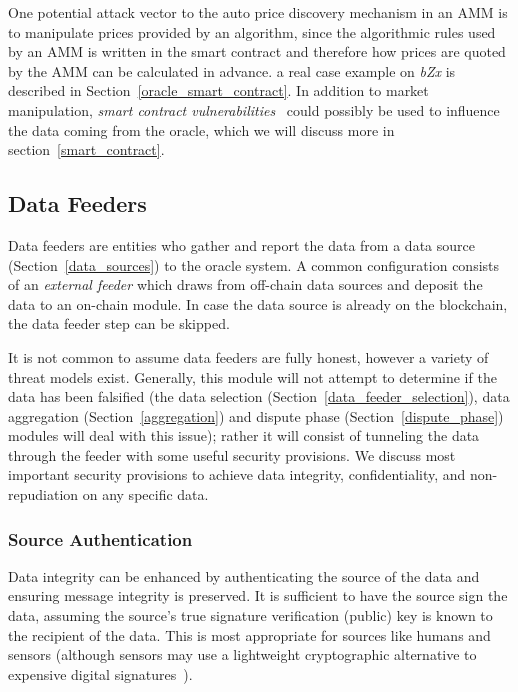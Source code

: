 
One potential attack vector to the auto price discovery mechanism in an AMM is to manipulate prices provided by an algorithm, since the algorithmic rules used by an AMM is written in the smart contract and therefore how prices are quoted by the AMM can be calculated in advance. a real case example on \textit{bZx} is described in Section~\ref{oracle_smart_contract}. In addition to market manipulation, \textit{smart contract vulnerabilities}~\cite{atzei2017survey,chen2020survey} could possibly be used to influence the data coming from the oracle, which we will discuss more in section~\ref{smart_contract}.



\subsection{Data Feeders}\label{data_feeders} 

Data feeders are entities who gather and report the data from a data source (Section~\ref{data_sources}) to the oracle system. 
A common configuration consists of an \textit{external feeder} which draws from off-chain data sources and deposit the data to an on-chain module. In case the data source is already on the blockchain, the data feeder step can be skipped.

It is not common to assume data feeders are fully honest, however a variety of threat models exist. Generally, this module will not attempt to determine if the data has been falsified (the data selection (Section~\ref{data_feeder_selection}), data aggregation (Section~\ref{aggregation}) and dispute phase (Section~\ref{dispute_phase}) modules will deal with this issue); rather it will consist of tunneling the data through the feeder with some useful security provisions. We discuss most important security provisions to achieve data integrity, confidentiality, and non-repudiation on any specific data. 


\subsubsection{Source Authentication}\label{source_authentication}
Data integrity can be enhanced by authenticating the source of the data and ensuring message integrity is preserved. It is sufficient to have the source sign the data, assuming the source's true signature verification (\ie public) key is known to the recipient of the data. This is most appropriate for sources like humans and sensors (although sensors may use a lightweight cryptographic alternative to expensive digital signatures~\cite{sallam2018survey}).

